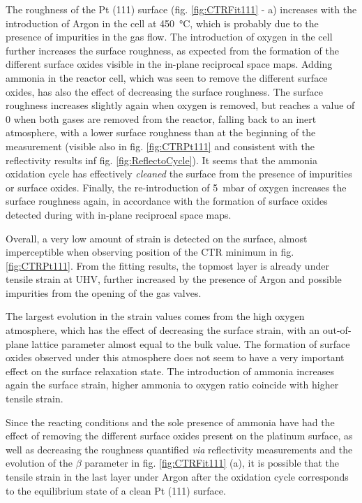 The roughness of the Pt (111) surface (fig. \ref{fig:CTRFit111} - a) increases with the introduction of Argon in the cell at \qty{450}{\degreeCelsius}, which is probably due to the presence of impurities in the gas flow.
The introduction of oxygen in the cell further increases the surface roughness, as expected from the formation of the different surface oxides visible in the in-plane reciprocal space maps.
Adding ammonia in the reactor cell, which was seen to remove the different surface oxides, has also the effect of decreasing the surface roughness.
The surface roughness increases slightly again when oxygen is removed, but reaches a value of 0 when both gases are removed from the reactor, falling back to an inert atmosphere, with a lower surface roughness than at the beginning of the measurement (visible also in fig. \ref{fig:CTRPt111} and consistent with the reflectivity results inf fig. \ref{fig:ReflectoCycle}).
It seems that the ammonia oxidation cycle has effectively \textit{cleaned} the surface from the presence of impurities or surface oxides.
Finally, the re-introduction of \qty{5}{\milli\bar} of oxygen increases the surface roughness again, in accordance with the formation of surface oxides detected during with in-plane reciprocal space maps.

Overall, a very low amount of strain is detected on the surface, almost imperceptible when observing position of the CTR minimum in fig. \ref{fig:CTRPt111}.
From the fitting results, the topmost layer is already under tensile strain at UHV, further increased by the presence of Argon and possible impurities from the opening of the gas valves.

The largest evolution in the strain values comes from the high oxygen atmosphere, which has the effect of decreasing the surface strain, with an out-of-plane lattice parameter almost equal to the bulk value.
The formation of surface oxides observed under this atmosphere does not seem to have a very important effect on the surface relaxation state.
The introduction of ammonia increases again the surface strain, higher ammonia to oxygen ratio coincide with higher tensile strain.

Since the reacting conditions and the sole presence of ammonia have had the effect of removing the different surface oxides present on the platinum surface, as well as decreasing the roughness quantified \textit{via} reflectivity measurements and the evolution of the $\beta$ parameter in fig. \ref{fig:CTRFit111} (a), it is possible that the tensile strain in the last layer under Argon after the oxidation cycle corresponds to the equilibrium state of a clean Pt (111) surface.

